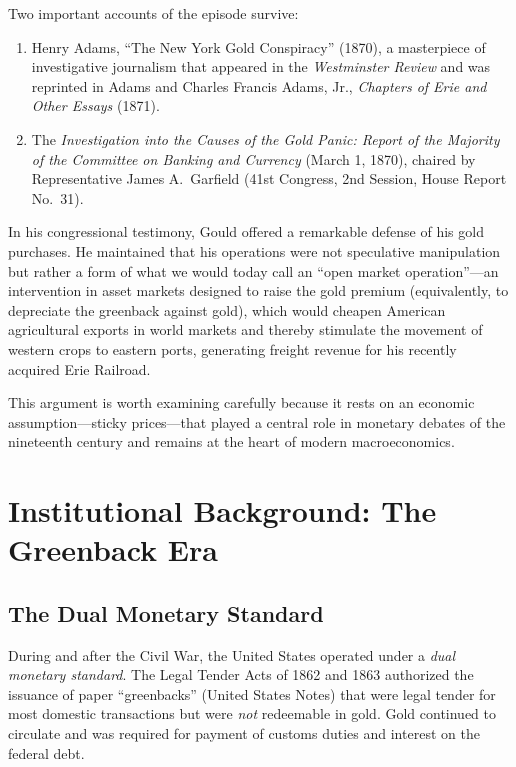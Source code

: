 \documentclass[12pt]{article}
\begin{document}
Two important accounts of the episode survive:
\begin{enumerate}
    \item Henry Adams, ``The New York Gold Conspiracy'' (1870), a 
    masterpiece of investigative journalism that appeared in the 
    \emph{Westminster Review} and was reprinted in Adams and Charles 
    Francis Adams, Jr., \emph{Chapters of Erie and Other Essays} (1871).
    \item The \emph{Investigation into the Causes of the Gold Panic: 
    Report of the Majority of the Committee on Banking and Currency} 
    (March 1, 1870), chaired by Representative James A.\ Garfield 
    (41st Congress, 2nd Session, House Report No.\ 31).
\end{enumerate}

In his congressional testimony, Gould offered a remarkable defense of his 
gold purchases. He maintained that his operations were not speculative 
manipulation but rather a form of what we would today call an ``open 
market operation''---an intervention in asset markets designed to raise the 
gold premium (equivalently, to depreciate the greenback against gold), 
which would cheapen American agricultural exports in world markets and 
thereby stimulate the movement of western crops to eastern ports, 
generating freight revenue for his recently acquired Erie Railroad.

This argument is worth examining carefully because it rests on an economic 
assumption---sticky prices---that played a central role in monetary 
debates of the nineteenth century and remains at the heart of modern 
macroeconomics.

\section{Institutional Background: The Greenback Era}

\subsection{The Dual Monetary Standard}

During and after the Civil War, the United States operated under a 
\emph{dual monetary standard}. The Legal Tender Acts of 1862 and 1863 
authorized the issuance of paper ``greenbacks'' (United States Notes) 
that were legal tender for most domestic transactions but were \emph{not} 
redeemable in gold. Gold continued to circulate and was required for 
payment of customs duties and interest on the federal debt.
\end{document}
